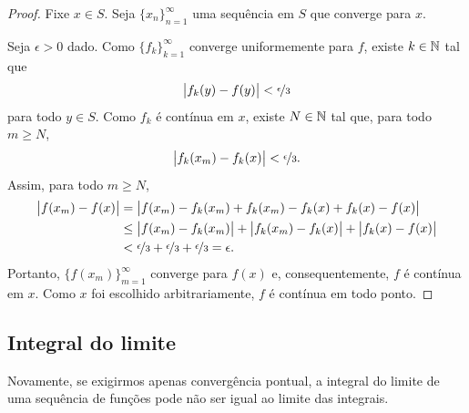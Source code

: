 \begin{proof}
Fixe $x \in S$. Seja $\{ x_n \}_{n=1}^\infty$ uma sequência em $S$ que
converge para $x$.

Seja $\epsilon > 0$ dado.
Como $\{ f_k \}_{k=1}^\infty$ converge uniformemente para $f$, existe
$k \in {\mathbb{N}}$ tal que
\begin{equation*}
\bigl\lvert {f_k(y)-f(y)} \bigr\rvert < \nicefrac{\epsilon}{3}
\end{equation*}
para todo $y \in S$. Como $f_k$ é contínua em $x$, existe $N \in {\mathbb{N}}$ tal
que, para todo $m \geq N$,
\begin{equation*}
\bigl\lvert {f_k(x_m)-f_k(x)} \bigr\rvert < \nicefrac{\epsilon}{3} .
\end{equation*}
Assim, para todo $m \geq N$,
\begin{equation*}
\begin{split}
\bigl\lvert {f(x_m)-f(x)} \bigr\rvert
& =
\bigl\lvert {f(x_m)-f_k(x_m)+f_k(x_m)-f_k(x)+f_k(x)-f(x)} \bigr\rvert
\\
& \leq
\bigl\lvert {f(x_m)-f_k(x_m)} \bigr\rvert+
\bigl\lvert {f_k(x_m)-f_k(x)} \bigr\rvert+
\bigl\lvert {f_k(x)-f(x)} \bigr\rvert
\\
& <
\nicefrac{\epsilon}{3} +
\nicefrac{\epsilon}{3} +
\nicefrac{\epsilon}{3} = \epsilon .
\end{split}
\end{equation*}
Portanto, $\bigl\{ f(x_m) \bigr\}_{m=1}^\infty$ converge para $f(x)$ e,
consequentemente, $f$ é contínua em $x$.
Como $x$ foi escolhido arbitrariamente, $f$ é contínua em todo ponto.
\end{proof}

\subsection{Integral do limite}

Novamente, se exigirmos apenas convergência pontual, a integral do limite
de uma sequência de funções pode não ser igual ao limite das integrais.

